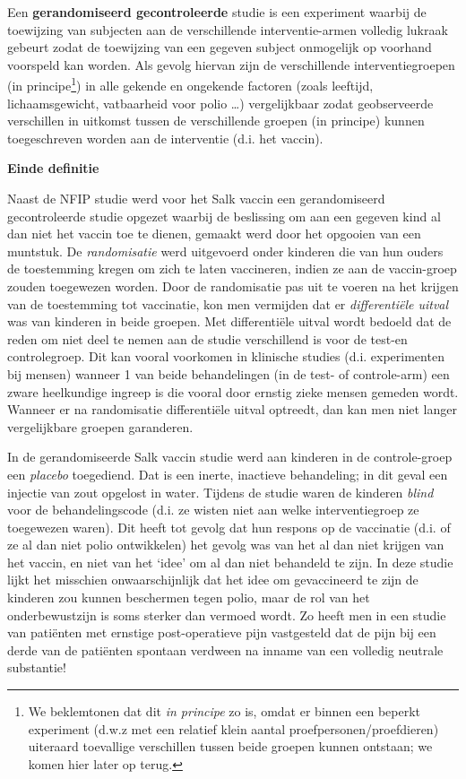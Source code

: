 \documentclass[
  12pt,dutch,coursenotes]{book}
\theoremstyle{definition}
\theoremstyle{definition}
\theoremstyle{definition}
\theoremstyle{remark}
\begin{document}
Een \textbf{gerandomiseerd gecontroleerde} studie is een experiment waarbij
de toewijzing van subjecten aan de verschillende interventie-armen volledig
lukraak gebeurt zodat de toewijzing van een gegeven subject onmogelijk op
voorhand voorspeld kan worden. Als gevolg hiervan zijn de verschillende
interventiegroepen (in principe\footnote{We beklemtonen dat dit \emph{in principe} zo is, omdat er binnen een beperkt experiment (d.w.z met een relatief klein aantal proefpersonen/proefdieren) uiteraard toevallige verschillen tussen beide groepen kunnen ontstaan; we komen hier later op terug.}) in alle gekende en ongekende factoren (zoals
leeftijd, lichaamsgewicht, vatbaarheid voor polio \ldots) vergelijkbaar zodat
geobserveerde verschillen in uitkomst tussen de verschillende groepen (in
principe) kunnen toegeschreven worden aan de interventie (d.i. het vaccin).

\textbf{Einde definitie}

Naast de NFIP studie werd voor het Salk vaccin een gerandomiseerd
gecontroleerde studie opgezet waarbij de beslissing om aan een gegeven kind
al dan niet het vaccin toe te dienen, gemaakt werd door het opgooien van een
muntstuk. De \emph{randomisatie} werd uitgevoerd onder kinderen die van
hun ouders de toestemming kregen om zich te laten vaccineren, indien ze aan de
vaccin-groep zouden toegewezen worden. Door de randomisatie pas uit te
voeren na het krijgen van de toestemming tot vaccinatie, kon men vermijden
dat er \emph{differentiële uitval} was van kinderen in beide
groepen. Met differentiële uitval wordt bedoeld dat de reden om niet
deel te nemen aan de studie verschillend is voor de test-en controlegroep.
Dit kan vooral voorkomen in klinische studies (d.i. experimenten bij mensen)
wanneer 1 van beide behandelingen (in de test- of
controle-arm) een zware heelkundige ingreep is die vooral door ernstig zieke
mensen gemeden wordt. Wanneer er na randomisatie differentiële uitval
optreedt, dan kan men niet langer vergelijkbare groepen garanderen.

In de gerandomiseerde Salk vaccin studie werd aan kinderen in de
controle-groep een \emph{placebo} toegediend. Dat is een inerte, inactieve
behandeling; in dit geval een injectie van zout opgelost in water. Tijdens
de studie waren de kinderen \emph{blind} voor de behandelingscode (d.i. ze
wisten niet aan welke interventiegroep ze toegewezen waren). Dit heeft tot
gevolg dat hun respons op de vaccinatie (d.i. of ze al dan niet polio
ontwikkelen) het gevolg was van het al dan niet krijgen van het vaccin, en
niet van het `idee' om al dan niet behandeld te zijn. In deze studie lijkt het misschien onwaarschijnlijk dat het idee
om gevaccineerd te zijn de kinderen zou kunnen beschermen tegen polio, maar
de rol van het onderbewustzijn is soms sterker dan vermoed wordt. Zo heeft
men in een studie van patiënten met ernstige post-operatieve pijn
vastgesteld dat de pijn bij een derde van de patiënten spontaan verdween
na inname van een volledig neutrale substantie!
\end{document}
